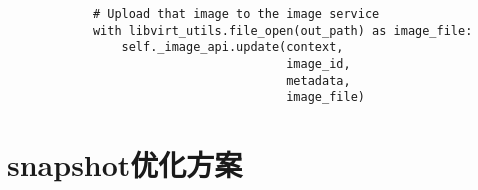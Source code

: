 \documentclass[a4paper,left=1.5cm,right=1.5cm,11pt]{article}
\begin{document}
\begin{lstlisting}
            # Upload that image to the image service
            with libvirt_utils.file_open(out_path) as image_file:
                self._image_api.update(context,
                                       image_id,
                                       metadata,
                                       image_file)
    \end{lstlisting}

\section{snapshot优化方案}
\end{document}
